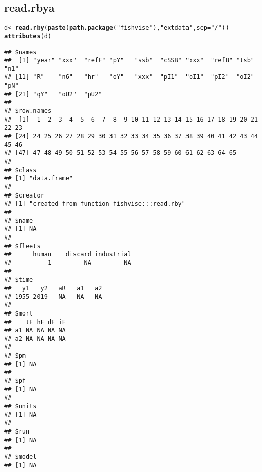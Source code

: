\documentclass[a4paper]{article}\usepackage{graphicx, color}
\makeatletter
\newcommand{\hlfunctioncall}[1]{\textcolor[rgb]{0.501960784313725,0,0.329411764705882}{\textbf{#1}}}%
\newcommand{\hlstring}[1]{\textcolor[rgb]{0.6,0.6,1}{#1}}%
\newenvironment{kframe}{%
 \def\at@end@of@kframe{}%
 \ifinner\ifhmode%
  \def\at@end@of@kframe{\end{minipage}}%
  \begin{minipage}{\columnwidth}%
 \fi\fi%
 \def\FrameCommand##1{\hskip\@totalleftmargin \hskip-\fboxsep
 \colorbox{shadecolor}{##1}\hskip-\fboxsep
     \hskip-\linewidth \hskip-\@totalleftmargin \hskip\columnwidth}%
 \MakeFramed {\advance\hsize-\width
   \@totalleftmargin\z@ \linewidth\hsize
   \@setminipage}}%
 {\par\unskip\endMakeFramed%
 \at@end@of@kframe}
\newenvironment{knitrout}{}{} %
\makeatother
\begin{document}
\newpage{}
\subsection*{read.rbya}
\begin{knitrout}
\color{fgcolor}\begin{kframe}
\begin{alltt}
d <- \hlfunctioncall{read.rby}(\hlfunctioncall{paste}(\hlfunctioncall{path.package}(\hlstring{"fishvise"}), \hlstring{"extdata"}, sep = \hlstring{"/"}))
\hlfunctioncall{attributes}(d)
\end{alltt}
\begin{verbatim}
## $names
##  [1] "year" "xxx"  "refF" "pY"   "ssb"  "cSSB" "xxx"  "refB" "tsb"  "n1"  
## [11] "R"    "n6"   "hr"   "oY"   "xxx"  "pI1"  "oI1"  "pI2"  "oI2"  "pN"  
## [21] "qY"   "oU2"  "pU2" 
## 
## $row.names
##  [1]  1  2  3  4  5  6  7  8  9 10 11 12 13 14 15 16 17 18 19 20 21 22 23
## [24] 24 25 26 27 28 29 30 31 32 33 34 35 36 37 38 39 40 41 42 43 44 45 46
## [47] 47 48 49 50 51 52 53 54 55 56 57 58 59 60 61 62 63 64 65
## 
## $class
## [1] "data.frame"
## 
## $creator
## [1] "created from function fishvise:::read.rby"
## 
## $name
## [1] NA
## 
## $fleets
##      human    discard industrial 
##          1         NA         NA 
## 
## $time
##   y1   y2   aR   a1   a2 
## 1955 2019   NA   NA   NA 
## 
## $mort
##    tF hF dF iF
## a1 NA NA NA NA
## a2 NA NA NA NA
## 
## $pm
## [1] NA
## 
## $pf
## [1] NA
## 
## $units
## [1] NA
## 
## $run
## [1] NA
## 
## $model
## [1] NA
\end{verbatim}
\end{kframe}
\end{knitrout}
\end{document}
